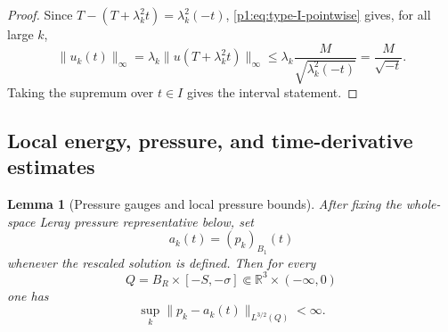\documentclass[11pt]{amsart}
\theoremstyle{plain}
\newtheorem{lemma}[lemma]{Lemma}
\theoremstyle{definition}
\theoremstyle{remark}
\numberwithin{equation}{section}
\newcommand{\R}{\mathbb R}
\begin{document}
\begin{proof}
Since \(T-(T+\lambda_k^2t)=\lambda_k^2(-t)\), \eqref{p1:eq:type-I-pointwise}
gives, for all large \(k\),
\[
   \|u_k(t)\|_\infty
   =
   \lambda_k\|u(T+\lambda_k^2t)\|_\infty
   \le
   \lambda_k\frac{M}{\sqrt{\lambda_k^2(-t)}}
   =
   \frac{M}{\sqrt{-t}}.
\]
Taking the supremum over \(t\in I\) gives the interval statement.
\end{proof}

\subsection{Local energy, pressure, and time-derivative estimates}

\begin{lemma}[Pressure gauges and local pressure bounds]\label{p1:lem:pressure}
After fixing the whole-space Leray pressure representative below, set
\[
   a_k(t)=(p_k)_{B_1}(t)
\]
whenever the rescaled solution is defined.  Then for every
\[
   Q=B_R\times[-S,-\sigma]\Subset\R^3\times(-\infty,0)
\]
one has
\[
   \sup_k\|p_k-a_k(t)\|_{L^{3/2}(Q)}<\infty .
\]
\end{lemma}
\end{document}
